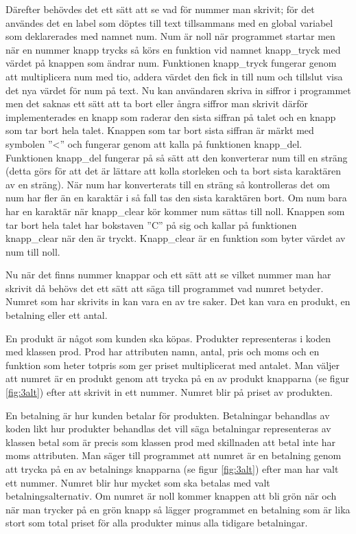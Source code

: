 \documentclass[a4paper, 12pt]{article}
\begin{document}
Därefter behövdes det ett sätt att se vad för nummer man skrivit; för det användes det en label som döptes till text tillsammans med en global variabel som deklarerades med namnet num.
Num är noll när programmet startar men när en nummer knapp trycks så körs en funktion vid namnet knapp\_tryck med värdet på knappen som ändrar num. Funktionen knapp\_tryck fungerar genom att multiplicera num med tio, addera värdet den fick in till num och tillslut visa det nya värdet för num på text. 
Nu kan användaren skriva in siffror i programmet men det saknas ett sätt att ta bort eller ångra siffror man skrivit därför implementerades en knapp som raderar den sista siffran på talet och en knapp som tar bort hela talet.
Knappen som tar bort sista siffran är märkt med symbolen ''\textless'' och fungerar genom att kalla på funktionen knapp\_del. Funktionen knapp\_del fungerar på så sätt att den konverterar num till en sträng (detta görs för att det är lättare att kolla storleken och ta bort sista karaktären av en sträng). 
När num har konverterats till en sträng så kontrolleras det om num har fler än en karaktär i så fall tas den sista karaktären bort. Om num bara har en karaktär när knapp\_clear kör kommer num sättas till noll.
Knappen som tar bort hela talet har bokstaven ''C'' på sig och kallar på funktionen knapp\_clear när den är tryckt. Knapp\_clear är en funktion som byter värdet av num till noll.


Nu när det finns nummer knappar och ett sätt att se vilket nummer man har skrivit då behövs det ett sätt att säga till programmet vad numret betyder. Numret som har skrivits in kan vara en av tre saker. 
Det kan vara en produkt, en betalning eller ett antal.

En produkt är något som kunden ska köpas. Produkter representeras i koden med klassen prod. Prod har attributen namn, antal, pris och moms och en funktion som heter totpris som ger priset multiplicerat med antalet. 
Man väljer att numret är en produkt genom att trycka på en av produkt knapparna (se figur \ref{fig:3alt}) efter att skrivit in ett nummer. Numret blir på priset av produkten.


En betalning är hur kunden betalar för produkten. Betalningar behandlas av koden likt hur produkter behandlas det vill säga
betalningar representeras av klassen betal som är precis som klassen prod med skillnaden att betal inte har moms attributen. Man säger till programmet att numret är en betalning genom att trycka på en av betalnings knapparna (se figur \ref{fig:3alt}) efter man har valt ett nummer. Numret blir hur mycket som ska betalas med valt betalningsalternativ. Om numret är noll kommer knappen att bli grön när och när man trycker på en grön knapp så lägger programmet en betalning som är lika stort som total priset för alla produkter minus alla tidigare betalningar.
\end{document}
